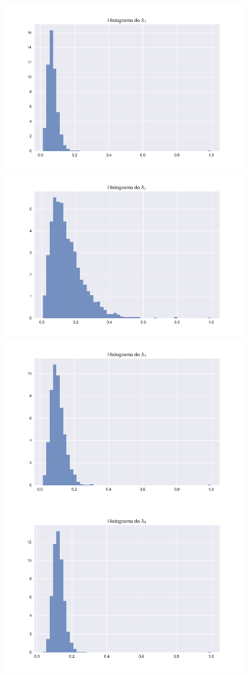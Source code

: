 \documentclass{article}
\begin{document}
\begin{enumerate}
    \begin{center}
        \includegraphics[width=0.8\textwidth]{Tarea8/hist0.png}
        \includegraphics[width=0.8\textwidth]{Tarea8/hist1.png}
        \includegraphics[width=0.8\textwidth]{Tarea8/hist2.png}
        \includegraphics[width=0.8\textwidth]{Tarea8/hist3.png}

\end{center}
\end{enumerate}
\end{document}
